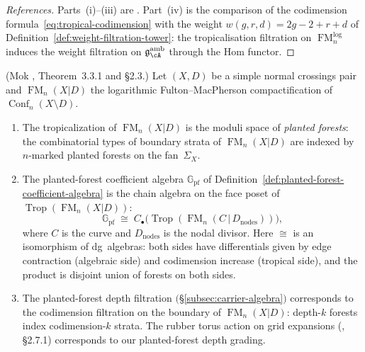 \begin{proof}[References]
Parts~(i)--(iii) are \cite[Theorem~3.3.1(2), Proposition~3.3.2,
Observation~5.2.5]{Mok25}.  Part~(iv) is the comparison of the
codimension formula~\eqref{eq:tropical-codimension} with the weight
$w(g,r,d) = 2g-2+r+d$ of
Definition~\ref{def:weight-filtration-tower}: the
tropicalisation filtration on $\operatorname{FM}^{\mathrm{log}}_n$
induces the weight filtration on
$\mathfrak{g}^{\mathrm{amb}}_{\cA}$ through the Hom functor.
\end{proof}

\begin{theorem}
\label{thm:planted-forest-tropicalization}%
%
%
%
\textup{(Mok \cite{Mok25}, Theorem~3.3.1 and \S2.3.)}
Let $(X,D)$ be a simple normal crossings pair and
$\operatorname{FM}_n(X|D)$ the logarithmic Fulton--MacPherson
compactification of $\operatorname{Conf}_n(X \setminus D)$.
\begin{enumerate}[label=\textup{(\roman*)}]
\item The tropicalization of $\operatorname{FM}_n(X|D)$ is the
  moduli space of \emph{planted forests}: the combinatorial types of
  boundary strata of $\operatorname{FM}_n(X|D)$ are indexed by
  $n$-marked planted forests on the fan~$\Sigma_X$.
\item The planted-forest coefficient algebra
  $\mathbb{G}_{\mathrm{pf}}$ of
  Definition~\textup{\ref{def:planted-forest-coefficient-algebra}} is
  the chain algebra on the face poset of
  $\operatorname{Trop}(\operatorname{FM}_n(X|D))$:
  \[
    \mathbb{G}_{\mathrm{pf}}
    \;\cong\;
    C_\bullet\bigl(
      \operatorname{Trop}(\operatorname{FM}_n(C\,|\,D_{\mathrm{nodes}}))
    \bigr),
  \]
  where $C$ is the curve and $D_{\mathrm{nodes}}$ is the nodal
  divisor.  Here $\cong$ is an isomorphism of dg~algebras: both
  sides have differentials given by edge contraction (algebraic side)
  and codimension increase (tropical side), and the product is
  disjoint union of forests on both sides.
\item The planted-forest depth filtration
  $($\S\textup{\ref{subsec:carrier-algebra}}$)$ corresponds to the
  codimension filtration on the boundary of
  $\operatorname{FM}_n(X|D)$: depth-$k$ forests index
  codimension-$k$ strata.  The rubber torus action on grid
  expansions \textup{(\cite{Mok25}, \S2.7.1)} corresponds to our
  planted-forest depth grading.
\end{enumerate}
\end{theorem}

